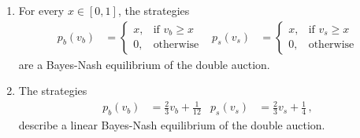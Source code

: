 \begin{theorem}
\label{thm:auc:double}
\begin{enumerate}
 \item For every $x \in [0,1]$, the strategies
 \begin{align*}
   p_b(v_b) &= \begin{cases} x, &\text{if } v_b \geq x \\ 0, &\text{otherwise}
   \end{cases}
   & 
   p_s(v_s) &= \begin{cases} x, &\text{if } v_s \geq x \\ 0, &\text{otherwise} \end{cases}
 \end{align*}
 are a Bayes-Nash equilibrium of the double auction.
 \item The strategies
  \begin{align*}
   p_b(v_b) &= \frac{2}{3} v_b + \frac{1}{12} & 
   p_s(v_s) &= \frac{2}{3} v_s + \frac{1}{4}\,,
  \end{align*}
  describe a linear Bayes-Nash equilibrium of the double auction.
\end{enumerate}
\end{theorem}
